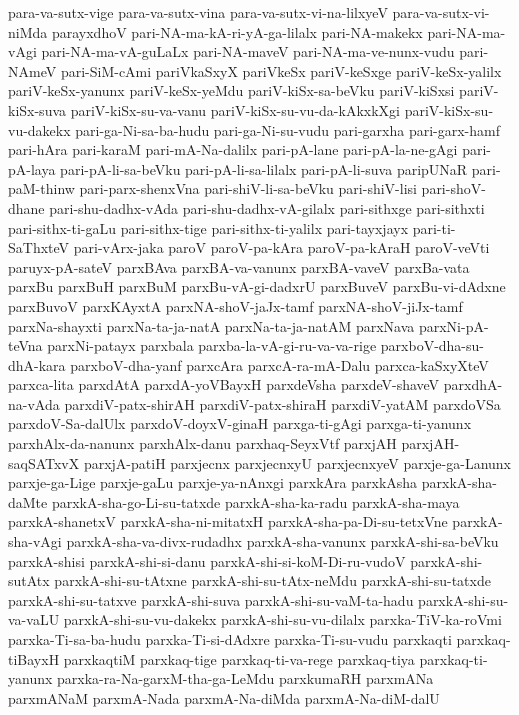 {para-va-sutx-vige
para-va-sutx-vina
para-va-sutx-vi-na-lilxyeV
para-va-sutx-vi-niMda
parayxdhoV
pari-NA-ma-kA-ri-yA-ga-lilalx
pari-NA-makekx
pari-NA-ma-vAgi
pari-NA-ma-vA-guLaLx
pari-NA-maveV
pari-NA-ma-ve-nunx-vudu
pari-NAmeV
pari-SiM-cAmi
pariVkaSxyX
pariVkeSx
pariV-keSxge
pariV-keSx-yalilx
pariV-keSx-yanunx
pariV-keSx-yeMdu
pariV-kiSx-sa-beVku
pariV-kiSxsi
pariV-kiSx-suva
pariV-kiSx-su-va-vanu
pariV-kiSx-su-vu-da-kAkxkXgi
pariV-kiSx-su-vu-dakekx
pari-ga-Ni-sa-ba-hudu
pari-ga-Ni-su-vudu
pari-garxha
pari-garx-hamf
pari-hAra
pari-karaM
pari-mA-Na-dalilx
pari-pA-lane
pari-pA-la-ne-gAgi
pari-pA-laya
pari-pA-li-sa-beVku
pari-pA-li-sa-lilalx
pari-pA-li-suva
paripUNaR
pari-paM-thinw
pari-parx-shenxVna
pari-shiV-li-sa-beVku
pari-shiV-lisi
pari-shoV-dhane
pari-shu-dadhx-vAda
pari-shu-dadhx-vA-gilalx
pari-sithxge
pari-sithxti
pari-sithx-ti-gaLu
pari-sithx-tige
pari-sithx-ti-yalilx
pari-tayxjayx
pari-ti-SaThxteV
pari-vArx-jaka
paroV
paroV-pa-kAra
paroV-pa-kAraH
paroV-veVti
paruyx-pA-sateV
parxBAva
parxBA-va-vanunx
parxBA-vaveV
parxBa-vata
parxBu
parxBuH
parxBuM
parxBu-vA-gi-dadxrU
parxBuveV
parxBu-vi-dAdxne
parxBuvoV
parxKAyxtA
parxNA-shoV-jaJx-tamf
parxNA-shoV-jiJx-tamf
parxNa-shayxti
parxNa-ta-ja-natA
parxNa-ta-ja-natAM
parxNava
parxNi-pA-teVna
parxNi-patayx
parxbala
parxba-la-vA-gi-ru-va-va-rige
parxboV-dha-su-dhA-kara
parxboV-dha-yanf
parxcAra
parxcA-ra-mA-Dalu
parxca-kaSxyXteV
parxca-lita
parxdAtA
parxdA-yoVBayxH
parxdeVsha
parxdeV-shaveV
parxdhA-na-vAda
parxdiV-patx-shirAH
parxdiV-patx-shiraH
parxdiV-yatAM
parxdoVSa
parxdoV-Sa-dalUlx
parxdoV-doyxV-ginaH
parxga-ti-gAgi
parxga-ti-yanunx
parxhAlx-da-nanunx
parxhAlx-danu
parxhaq-SeyxVtf
parxjAH
parxjAH-saqSATxvX
parxjA-patiH
parxjecnx
parxjecnxyU
parxjecnxyeV
parxje-ga-Lanunx
parxje-ga-Lige
parxje-gaLu
parxje-ya-nAnxgi
parxkAra
parxkAsha
parxkA-sha-daMte
parxkA-sha-go-Li-su-tatxde
parxkA-sha-ka-radu
parxkA-sha-maya
parxkA-shanetxV
parxkA-sha-ni-mitatxH
parxkA-sha-pa-Di-su-tetxVne
parxkA-sha-vAgi
parxkA-sha-va-divx-rudadhx
parxkA-sha-vanunx
parxkA-shi-sa-beVku
parxkA-shisi
parxkA-shi-si-danu
parxkA-shi-si-koM-Di-ru-vudoV
parxkA-shi-sutAtx
parxkA-shi-su-tAtxne
parxkA-shi-su-tAtx-neMdu
parxkA-shi-su-tatxde
parxkA-shi-su-tatxve
parxkA-shi-suva
parxkA-shi-su-vaM-ta-hadu
parxkA-shi-su-va-vaLU
parxkA-shi-su-vu-dakekx
parxkA-shi-su-vu-dilalx
parxka-TiV-ka-roVmi
parxka-Ti-sa-ba-hudu
parxka-Ti-si-dAdxre
parxka-Ti-su-vudu
parxkaqti
parxkaq-tiBayxH
parxkaqtiM
parxkaq-tige
parxkaq-ti-va-rege
parxkaq-tiya
parxkaq-ti-yanunx
parxka-ra-Na-garxM-tha-ga-LeMdu
parxkumaRH
parxmANa
parxmANaM
parxmA-Nada
parxmA-Na-diMda
parxmA-Na-diM-dalU
}
